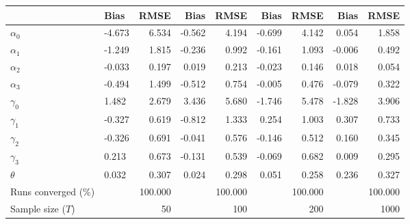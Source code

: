 
\begin{tabular}[t]{llrrrrrrr}
\toprule
  & Bias & RMSE & Bias & RMSE & Bias & RMSE & Bias & RMSE\\
\midrule
$\alpha_{0}$ & -4.673 & 6.534 & -0.562 & 4.194 & -0.699 & 4.142 & 0.054 & 1.858\\
$\alpha_{1}$ & -1.249 & 1.815 & -0.236 & 0.992 & -0.161 & 1.093 & -0.006 & 0.492\\
$\alpha_{2}$ & -0.033 & 0.197 & 0.019 & 0.213 & -0.023 & 0.146 & 0.018 & 0.054\\
$\alpha_{3}$ & -0.494 & 1.499 & -0.512 & 0.754 & -0.005 & 0.476 & -0.079 & 0.322\\
$\gamma_{0}$ & 1.482 & 2.679 & 3.436 & 5.680 & -1.746 & 5.478 & -1.828 & 3.906\\
$\gamma_{1}$ & -0.327 & 0.619 & -0.812 & 1.333 & 0.254 & 1.003 & 0.307 & 0.733\\
$\gamma_{2}$ & -0.326 & 0.691 & -0.041 & 0.576 & -0.146 & 0.512 & 0.160 & 0.345\\
$\gamma_{3}$ & 0.213 & 0.673 & -0.131 & 0.539 & -0.069 & 0.682 & 0.009 & 0.295\\
$\theta$ & 0.032 & 0.307 & 0.024 & 0.298 & 0.051 & 0.258 & 0.236 & 0.327\\
Runs converged (\%) &  & 100.000 &  & 100.000 &  & 100.000 &  & 100.000\\
Sample size ($T$) &  & 50 &  & 100 &  & 200 &  & 1000\\
\bottomrule
\end{tabular}
